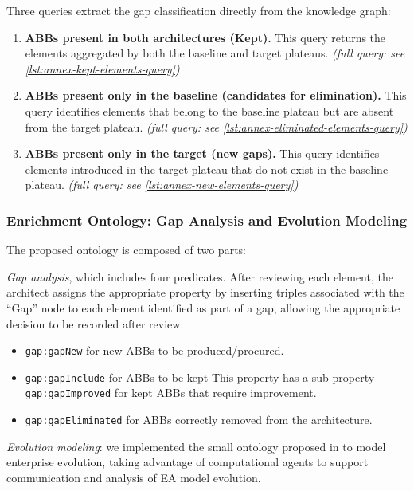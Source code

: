 Three queries extract the gap classification directly from the knowledge graph:

\begin{enumerate}
    \item \textbf{ABBs present in both architectures (Kept).} This query returns the elements aggregated by both the baseline and target plateaus. \textit{(full query: see \autoref{lst:annex-kept-elements-query})}
    \item \textbf{ABBs present only in the baseline (candidates for elimination).} This query identifies elements that belong to the baseline plateau but are absent from the target plateau. \textit{(full query: see \autoref{lst:annex-eliminated-elements-query})}
    \item \textbf{ABBs present only in the target (new gaps).} This query identifies elements introduced in the target plateau that do not exist in the baseline plateau. \textit{(full query: see \autoref{lst:annex-new-elements-query})}
\end{enumerate}

\subsubsection{Enrichment Ontology: Gap Analysis and Evolution Modeling}

The proposed ontology is composed of two parts:

\emph{Gap analysis}, which includes four predicates. After reviewing each element, the architect assigns the appropriate property by inserting triples associated with the ``Gap'' node to each element identified as part of a gap, allowing the appropriate decision to be recorded after review:

\begin{itemize}
    \item \texttt{gap:gapNew} for new ABBs to be produced/procured.
    \item \texttt{gap:gapInclude} for ABBs to be kept This property has a sub-property \texttt{gap:gapImproved} for kept ABBs that require improvement.
    \item \texttt{gap:gapEliminated} for ABBs correctly removed from the architecture.
\end{itemize}

\emph{Evolution modeling}: we implemented the small ontology proposed in \parencite{silva2017evolution} to model enterprise evolution, taking advantage of computational agents to support communication and analysis of EA model evolution.

